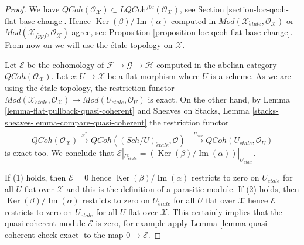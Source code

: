 \documentclass[10pt,a4paper]{amsart}
\theoremstyle{plain}
\theoremstyle{definition}
\theoremstyle{remark}
\numberwithin{equation}{subsection}
\def\Sch{\mathit{Sch}}
\def\etale{{\acute{e}tale}}
\def\QCoh{\mathit{QCoh}}
\def\Ker{\mathop{\mathrm{Ker}}}
\def\Im{\mathop{\mathrm{Im}}}
\begin{document}
\begin{proof}
We have $\QCoh(\mathcal{O}_\mathcal{X}) \subset
\textit{LQCoh}^{fbc}(\mathcal{O}_\mathcal{X})$, see
Section \ref{section-loc-qcoh-flat-base-change}.
Hence $\Ker(\beta)/\Im(\alpha)$ computed in
$\textit{Mod}(\mathcal{X}_\etale, \mathcal{O}_\mathcal{X})$ or
$\textit{Mod}(\mathcal{X}_{fppf}, \mathcal{O}_\mathcal{X})$ agree, see
Proposition \ref{proposition-loc-qcoh-flat-base-change}.
From now on we will use the \'etale topology on $\mathcal{X}$.

\medskip\noindent
Let $\mathcal{E}$ be the cohomology of
$\mathcal{F} \to \mathcal{G} \to \mathcal{H}$
computed in the abelian category $\QCoh(\mathcal{O}_\mathcal{X})$.
Let $x : U \to \mathcal{X}$ be a flat morphism where $U$ is a scheme.
As we are using the \'etale topology, the restriction functor
$\textit{Mod}(\mathcal{X}_\etale, \mathcal{O}_\mathcal{X})
\to \textit{Mod}(U_\etale, \mathcal{O}_U)$ is exact.
On the other hand, by Lemma \ref{lemma-flat-pullback-quasi-coherent} and
Sheaves on Stacks, Lemma \ref{stacks-sheaves-lemma-compare-quasi-coherent}
the restriction functor
$$
\QCoh(\mathcal{O}_\mathcal{X}) \xrightarrow{x^*}
\QCoh((\Sch/U)_\etale, \mathcal{O}) \xrightarrow{{-}|_{U_\etale}}
\QCoh(U_\etale, \mathcal{O}_U)
$$
is exact too. We conclude that
$\mathcal{E}|_{U_\etale} = (\Ker(\beta)/\Im(\alpha))|_{U_\etale}$.

\medskip\noindent
If (1) holds, then $\mathcal{E} = 0$ hence $\Ker(\beta)/\Im(\alpha)$
restricts to zero on $U_\etale$ for all $U$ flat over $\mathcal{X}$ and this
is the definition of a parasitic module. If (2) holds, then
$\Ker(\beta)/\Im(\alpha)$ restricts to zero on $U_\etale$ for all $U$
flat over $\mathcal{X}$ hence $\mathcal{E}$ restricts to zero on
$U_\etale$ for all $U$ flat over $\mathcal{X}$. This certainly implies
that the quasi-coherent module $\mathcal{E}$ is zero, for example apply
Lemma \ref{lemma-quasi-coherent-check-exact}
to the map $0 \to \mathcal{E}$.
\end{proof}
\end{document}
